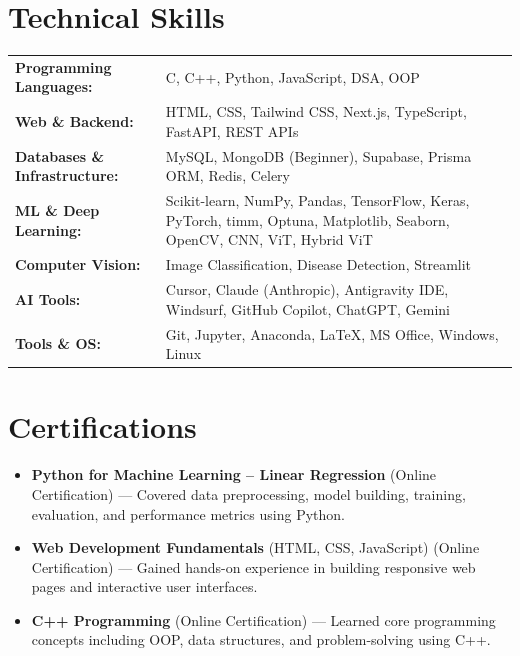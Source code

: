 \documentclass[11pt,letterpaper]{article}
\begin{document}
\section{Technical Skills}
\begin{tabularx}{\textwidth}{@{}l X@{}}
\textbf{Programming Languages:} & C, C++, Python, JavaScript, DSA, OOP \\
\textbf{Web \& Backend:} & HTML, CSS, Tailwind CSS, Next.js, TypeScript, FastAPI, REST APIs \\
\textbf{Databases \& Infrastructure:} & MySQL, MongoDB (Beginner), Supabase, Prisma ORM, Redis, Celery \\
\textbf{ML \& Deep Learning:} & Scikit-learn, NumPy, Pandas, TensorFlow, Keras, PyTorch, timm, Optuna, Matplotlib, Seaborn, OpenCV, CNN, ViT, Hybrid ViT \\
\textbf{Computer Vision:} & Image Classification, Disease Detection, Streamlit \\
\textbf{AI Tools:} & Cursor, Claude (Anthropic), Antigravity IDE, Windsurf, GitHub Copilot, ChatGPT, Gemini \\
\textbf{Tools \& OS:} & Git, Jupyter, Anaconda, \LaTeX, MS Office, Windows, Linux \\
\end{tabularx}

\section{Certifications}
\begin{itemize}
  \item \textbf{Python for Machine Learning -- Linear Regression} (Online Certification) --- Covered data preprocessing, model building, training, evaluation, and performance metrics using Python.
  \item \textbf{Web Development Fundamentals} (HTML, CSS, JavaScript) (Online Certification) --- Gained hands-on experience in building responsive web pages and interactive user interfaces.
  \item \textbf{C++ Programming} (Online Certification) --- Learned core programming concepts including OOP, data structures, and problem-solving using C++.
\end{itemize}
\end{document}
